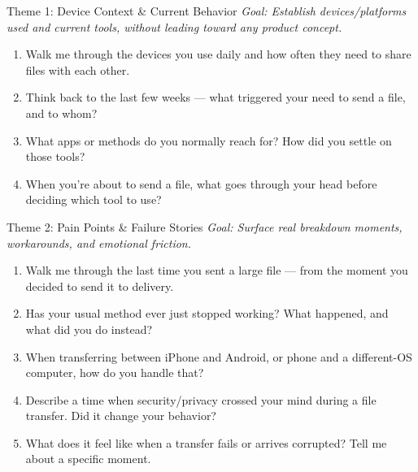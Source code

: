 \documentclass[xcolor=table,dvipsnames,svgnames,aspectratio=169]{beamer}
\begin{document}
\begin{frame}{Theme 1: Device Context \& Current Behavior}
  \textit{Goal: Establish devices/platforms used and current tools, without leading toward any product concept.}

  \vspace{0.8em}

  \begin{enumerate}
    \item[\textbf{Q1}] Walk me through the devices you use daily and how often they need to share files with each other.
    \item[\textbf{Q2}] Think back to the last few weeks --- what triggered your need to send a file, and to whom?
    \item[\textbf{Q3}] What apps or methods do you normally reach for? How did you settle on those tools?
    \item[\textbf{Q4}] When you're about to send a file, what goes through your head before deciding which tool to use?
  \end{enumerate}
\end{frame}

\begin{frame}{Theme 2: Pain Points \& Failure Stories}
  \textit{Goal: Surface real breakdown moments, workarounds, and emotional friction.}

  \vspace{0.8em}

  \begin{enumerate}
    \item[\textbf{Q5}] Walk me through the last time you sent a large file --- from the moment you decided to send it to delivery.
    \item[\textbf{Q6}] Has your usual method ever just stopped working? What happened, and what did you do instead?
    \item[\textbf{Q7}] When transferring between iPhone and Android, or phone and a different-OS computer, how do you handle that?
    \item[\textbf{Q8}] Describe a time when security/privacy crossed your mind during a file transfer. Did it change your behavior?
    \item[\textbf{Q9}] What does it feel like when a transfer fails or arrives corrupted? Tell me about a specific moment.
  \end{enumerate}
\end{frame}
\end{document}
